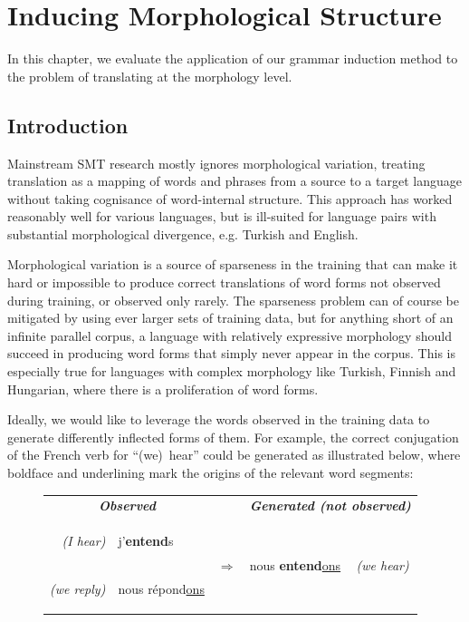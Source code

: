 \newcommand{\gloss}[1]{\begin{small}\textit{(#1)}\end{small}}
\newcommand{\pemph}[1]{\textbf{#1}}
\newcommand{\mmsz}{0.4\textwidth}
\newcommand{\mmultirow}[2]{\multirow{#1}{\mmsz}{#2}}

\chapter{Inducing Morphological Structure}

In this chapter, we evaluate the application of our grammar induction method to the problem of translating at the morphology level.

\section{Introduction}
Mainstream SMT research mostly ignores morphological variation, treating translation as a mapping of words and phrases from a source to a target language without taking cognisance of word-internal structure.
This approach has worked reasonably well for various languages, but is ill-suited for language pairs with substantial morphological divergence, e.g. Turkish and English.

Morphological variation is a source of sparseness in the training that can make it hard or impossible to produce correct translations of word forms not observed during training, or observed only rarely.
The sparseness problem can of course be mitigated by using ever larger sets of training data, but for anything short of an infinite parallel corpus, a language with relatively expressive morphology should succeed in producing word forms that simply never appear in the corpus.
This is especially true for languages with complex morphology like Turkish, Finnish and Hungarian, where there is a proliferation of word forms.

Ideally, we would like to leverage the words observed in the training data to generate differently inflected forms of them.
For example, the correct conjugation of the French verb for ``(we)~hear'' could be generated as illustrated below, where boldface and underlining mark the origins of the relevant word segments:

\begin{figure}[h]
\centering
	\begin{tabular}{rlcll}
	\multicolumn{2}{c}{\textbf{\textit{Observed}}} 	&  & \multicolumn{2}{c}{\textbf{\textit{Generated (not observed)}}} \\[5pt]
	\gloss{I hear} & j'\textbf{entend}s 
		&  \multirow{2}{*}{$\Longrightarrow$} 
		& \multirow{2}{*}{nous \textbf{entend}\underline{ons}} 
		& \multirow{2}{*}{\gloss{we hear}} \\ 
	\gloss{we reply} & nous r\'{e}pond\underline{ons} 	&  &  	& 
	\end{tabular} 
\end{figure}

